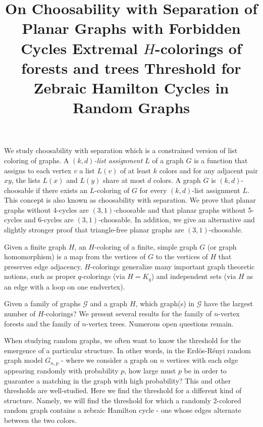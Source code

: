 \documentclass{article}
\begin{document}
\title{On Choosability with Separation of Planar Graphs with Forbidden Cycles}
\endtitle
We study choosability with separation which is a constrained
version of list coloring of graphs. A \emph{$(k,d)$-list assignment} $L$ of
a graph $G$ is a function that assigns to each vertex $v$ a list $L(v)$ of
at least $k$ colors and for any adjacent pair $xy$, the lists $L(x)$ and
$L(y)$ share at most $d$ colors. A graph $G$ is $(k,d)$-choosable if there
exists an $L$-coloring of $G$ for every $(k,d)$-list assignment $L$. This
concept is also known as choosability with separation. We prove that planar
graphs without 4-cycles are $(3,1)$-choosable and that planar graphs without
5-cycles and 6-cycles are $(3,1)$-choosable. In addition, we give an
alternative and slightly stronger proof that triangle-free planar graphs are
$(3,1)$-choosable. 


\vspace{.25in}

\title{ Extremal $H$-colorings of forests and trees}
\endtitle
Given a finite graph $H$, an $H$-coloring of a finite, simple
graph $G$ (or graph homomorphism) is a map from the vertices of $G$ to the
vertices of $H$ that preserves edge adjacency.  $H$-colorings generalize
many important graph theoretic notions, such as proper $q$-colorings (via $H
= K_{q}$) and independent sets (via $H$ as an edge with a loop on one
endvertex).

Given a family of graphs $\mathcal{G}$ and a graph $H$, which graph(s) in
$\mathcal{G}$ have the largest number of $H$-colorings?  We present several
results for the family of $n$-vertex forests and the family of $n$-vertex
trees.  Numerous open questions remain.


\vspace{.25in}

\title{ Threshold for Zebraic Hamilton Cycles in Random Graphs}
\endtitle
When studying random graphs, we often want to know the threshold for the emergence of a particular structure. In other words, in the Erd\"os-R\'enyi random graph model $G_{n,p}$ - where we consider a graph on $n$ vertices with each edge appearing randomly with probability $p$, how large must $p$ be in order to guarantee a matching in the graph with high probability? This and other thresholds are well-studied. Here we find the threshold for a different kind of structure. Namely, we will find the threshold for which a randomly 2-colored random graph contains a zebraic Hamilton cycle - one whose edges alternate between the two colors.
\end{document}
